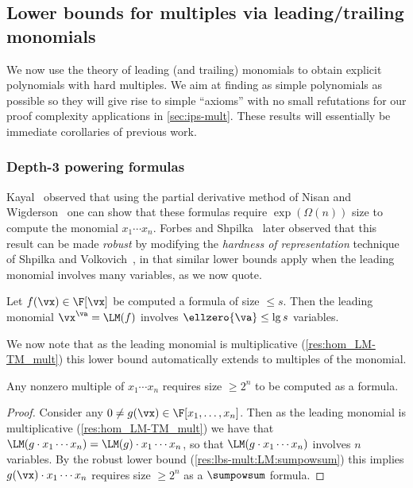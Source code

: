 \documentclass{toc}
\begin{document}
\subsection{Lower bounds for multiples via leading/trailing monomials}\label{sec:lbs-mult:LM}

We now use the theory of leading (and trailing) monomials to obtain explicit polynomials with hard multiples. We aim at finding as simple polynomials as possible so they will give rise to simple ``axioms'' with no small refutations for our proof complexity applications in \autoref{sec:ips-mult}. These results will essentially be immediate corollaries of previous work.

\subsubsection{Depth-3 powering formulas}

Kayal~\cite{Kayal08} observed that using the partial derivative method of Nisan and Wigderson~\cite{NisanWigderson96} one can show that these formulas require $\exp(\Omega(n))$ size to compute the monomial $x_1\cdots x_n$.  Forbes and Shpilka~\cite{ForbesShpilka13a} later observed that this result can be made \emph{robust} by modifying the \emph{hardness of representation} technique of Shpilka and Volkovich~\cite{ShpilkaVolkovich09}, in that similar lower bounds apply when the leading monomial involves many variables, as we now quote.

\begin{theoremwp}\label{res:lbs-mult:LM:sumpowsum}
        Let $f(\vx)\in\F[\vx]$ be computed a \sumpowsum formula of size $\le s$.  Then the leading monomial $\vx^\va=\LM(f)$ involves $\ellzero{\va}\le \lg s$ variables.
\end{theoremwp}

We now note that as the leading monomial is multiplicative (\autoref{res:hom_LM-TM_mult}) this lower bound automatically extends to multiples of the monomial.

\begin{corollary}\label{res:lbs-mult:sumpowsum}
        Any nonzero multiple of $x_1\cdots x_n$ requires size $\ge 2^n$ to be computed as a \sumpowsum formula.
\end{corollary}
\begin{proof}
        Consider any $0\ne g(\vx)\in\F[x_1,\ldots,x_n]$.  Then as the leading monomial is multiplicative (\autoref{res:hom_LM-TM_mult}) we have that $\LM(g\cdot x_1\cdots x_n)=\LM(g)\cdot x_1\cdots x_n$, so that $\LM(g\cdot x_1\cdots x_n)$ involves $n$ variables.  By the robust lower bound (\autoref{res:lbs-mult:LM:sumpowsum}) this implies $g(\vx)\cdot x_1\cdots x_n$ requires size $\ge 2^n$ as a $\sumpowsum$ formula.
\end{proof}
\end{document}
